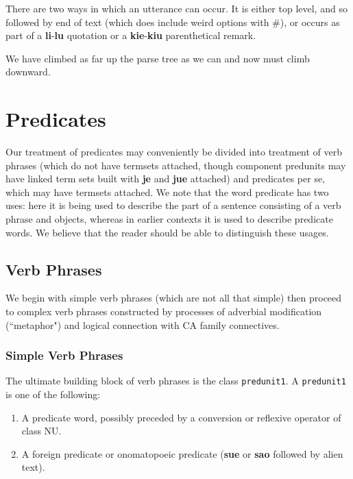 \documentclass[12pt]{book}
\begin{document}
{There are two ways in which an utterance can occur.  It is either top level, and so followed by end of text (which does include weird options with \#), or occurs as part of a {\bf li}-{\bf lu} quotation or a {\bf kie}-{\bf kiu} parenthetical remark.

We have climbed as far up the parse tree as we can and now must climb downward.

\newpage

\section{Predicates}

Our treatment of predicates may conveniently be divided into treatment of verb phrases (which do not have termsets attached, though component predunits may have linked term sets built with {\bf je} and {\bf jue} attached) and predicates per se, which may have termsets attached.  We note that the word predicate has two uses:  here it is being used to describe the part of a sentence consisting of a verb phrase and objects, whereas in earlier contexts it is used to describe predicate words.  We believe that the reader should be able to distinguish these usages.

\subsection{Verb Phrases}

We begin with simple verb phrases (which are not all that simple) then proceed to complex verb phrases constructed by processes of
adverbial modification (``metaphor") and logical connection with CA family connectives.

\subsubsection{Simple Verb Phrases}

The ultimate building block of verb phrases is the class {\tt predunit1}.  A {\tt predunit1} is one of the following:

\begin{enumerate}

\item  A predicate word, possibly preceded by a conversion or reflexive operator of class NU.

\item  A foreign predicate or onomatopoeic predicate ({\bf sue} or {\bf sao} followed by alien text).


\end{enumerate}}
\end{document}

